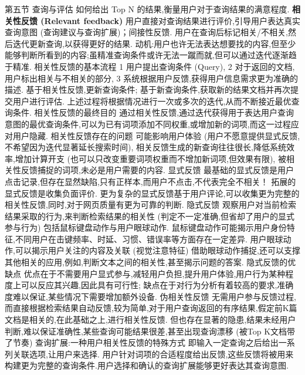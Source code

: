 \documentclass[10pt, utf8]{ctexart}
\begin{document}
\begin{multicols}{4}
    {\color{orange_}第五节 查询与评估}
    如何给出 Top N 的结果,衡量用户对于查询结果的满意程度.
    {\color{purple_}\textbf{相关性反馈 (Relevant feedback)}}
    用户直接对查询结果进行评价,引导用户表达真实查询意图 (查询建议与查询扩展)；间接性反馈.
    用户在查询后标记相关/不相关,然后迭代更新查询,以获得更好的结果.
    {\color{blue}动机}:用户也许无法表达想要找的内容,但至少能够判断所看到的内容;虽精准查询条件或许无法一蹴而就,但可以通过迭代逐渐趋于精准.
    {\color{blue}相关性反馈的基本流程}
    1 用户提出查询条件 (Query), 2 对于返回的文档,用户标出相关与不相关的部分, 3 系统根据用户反馈,获得用户信息需求更为准确的描述.
    基于相关性反馈,更新查询条件; 基于新查询条件,获取新的结果文档并再次提交用户进行评估.
    上述过程将根据情况进行一次或多次的迭代,从而不断接近最优查询条件.
    {\color{blue}相关性反馈的最终目的}
    通过相关性反馈,通过迭代获得用于表达用户查询意图的最优查询条件,可以为已有词项添加不同权重,或增加新的词项,而这一过程应对用户隐藏.
    {\color{blue}相关性反馈存在的问题}
    可能影响用户体验 (用户不愿意提供显式反馈,不希望因为迭代显著延长搜索时间),
    相关反馈生成的新查询往往很长,降低系统效率,增加计算开支 (也可以只改变重要词项权重而不增加新词项,但效果有限),
    被相关性反馈捕捉的词项,未必是用户需要的内容.
    {\color{blue}显式反馈}
    最基础的显式反馈是用户点击记录,但存在显然缺陷,只有正样本,而用户不点击,不代表完全不相关！
    拓展的显式反馈是收集负面评价.
    更为复杂的显式反馈基于用户评论,可以收集更为完整的相关性反馈,同时,对于网页质量有更为可靠的判断.
    {\color{blue}隐式反馈}
    观察用户对当前检索结果采取的行为,来判断检索结果的相关性 (判定不一定准确,但省却了用户的显式参与行为)
    包括鼠标键盘动作与用户眼球动作.
    鼠标键盘动作可能揭示用户身份特征,不同用户在击键频率、时延、习惯、错误率等方面存在一定差异.
    用户眼球动作,可以揭示用户关注的内容及关联 (视觉注意特征)
    借助眼球动作捕捉,还可以支撑其他相关的应用,例如,判断文本之间的相关性,甚至揭示问题的答案.
    {\color{blue}隐式反馈的优缺点}
    优点在于不需要用户显式参与,减轻用户负担,提升用户体验,用户行为某种程度上可以反应其兴趣,因此具有可行性;
    缺点在于对行为分析有着较高的要求,准确度难以保证,某些情况下需要增加额外设备.
    {\color{blue}伪相关性反馈}
    无需用户参与反馈过程,而直接根据检索结果自动反馈,较为简单,对于用户查询返回的有序结果,假定前K篇文档是相关的,在此基础之上,进行相关性反馈.
    但也存在显著的隐患,结果未经用户判断,难以保证准确性,某些查询可能结果很差,甚至出现查询漂移 (被Top K文档带了节奏)
    {\color{blue}查询扩展:一种用户相关性反馈的特殊方式}
    即输入一定查询之后给出一系列关联选项,让用户来选择.
    用户针对词项的合适程度给出反馈,这些反馈将被用来构建更为完整的查询条件.用户选择和确认的查询扩展能够更好表达其查询意图.

\end{multicols}
\end{document}
